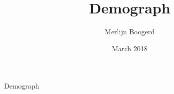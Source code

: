 \documentclass{article}
\title{Demograph}
\author{Merlijn Boogerd}
\date{March 2018}
\begin{document}
\maketitle Demograph











\end{document}
